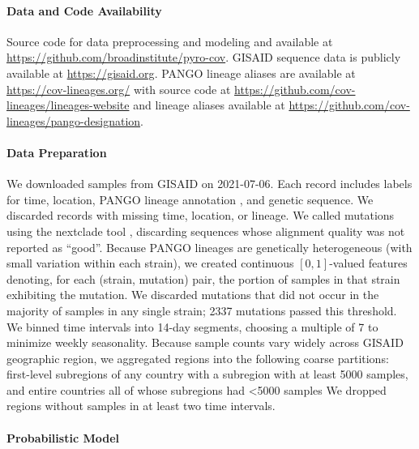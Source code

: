 \documentclass[12pt]{article}
\newcommand \TODO \fbox
\begin{document}
\paragraph*{Data and Code Availability}

Source code for data preprocessing and modeling and available at
\url{https://github.com/broadinstitute/pyro-cov}.
GISAID sequence data is publicly available at
\url{https://gisaid.org}.
PANGO lineage aliases are available at \url{https://cov-lineages.org/} with source code at \url{https://github.com/cov-lineages/lineages-website} and lineage aliases available at \url{https://github.com/cov-lineages/pango-designation}.

\paragraph*{Data Preparation}

We downloaded \TODO{XXX} samples from GISAID \TODO{cite} on 2021-07-06.
Each record includes labels for time, location, PANGO lineage annotation \TODO{cite}, and genetic sequence.
We discarded records with missing time, location, or lineage.
We called mutations using the nextclade tool \cite{aksamentov2020nextclade}, discarding sequences whose alignment quality was not reported as ``good''.
Because PANGO lineages are genetically heterogeneous (with small variation within each strain), we created continuous $[0, 1]$-valued features denoting, for each (strain, mutation) pair, the portion of samples in that strain exhibiting the mutation.
We discarded mutations that did not occur in the majority of samples in any single strain; 2337 mutations passed this threshold.
We binned time intervals into 14-day segments, choosing a multiple of 7 to minimize weekly seasonality.
Because sample counts vary widely across GISAID geographic region, we aggregated regions into the following coarse partitions: first-level subregions of any country with a subregion with at least 5000 samples, and entire countries all of whose subregions had <5000 samples
We dropped regions without samples in at least two time intervals.

\paragraph*{Probabilistic Model}

% 
\end{document}
